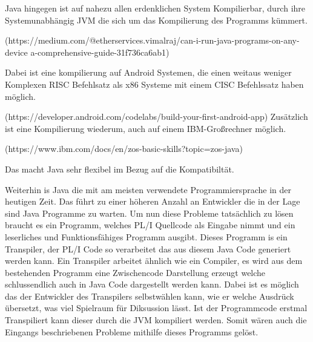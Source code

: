 Java hingegen ist auf nahezu allen erdenklichen System Kompilierbar, durch ihre Systemunabhängig JVM die sich um das Kompilierung des Programms kümmert. 

(https://medium.com/@etherservices.vimalraj/can-i-run-java-programs-on-any-device
a-comprehensive-guide-31f736ca6ab1) 

Dabei ist eine kompilierung auf Android Systemen, die einen weitaus weniger Komplexen RISC Befehlsatz als x86 Systeme mit einem CISC Befehlssatz haben möglich. 

(https://developer.android.com/codelabs/build-your-first-android-app) 
Zusätzlich ist eine Kompilierung wiederum, auch auf einem IBM-Großrechner möglich. 

(https://www.ibm.com/docs/en/zos-basic-skills?topic=zos-java)

Das macht Java sehr flexibel im Bezug auf die Kompatibiltät. 

Weiterhin is Java die mit am meisten verwendete Programmiersprache in der heutigen Zeit. Das führt zu einer höheren Anzahl an Entwickler die in der Lage sind Java Programme zu warten.
Um nun diese Probleme tatsächlich zu lösen braucht es ein Programm, welches PL/I Quellcode als Eingabe nimmt und ein leserliches und Funktionsfähiges Programm ausgibt. Dieses Programm is ein Transpiler, der PL/I Code so verarbeitet das aus diesem Java Code generiert werden kann. Ein Transpiler arbeitet ähnlich wie ein Compiler, es wird aus dem bestehenden Programm eine Zwischencode Darstellung erzeugt welche schlussendlich auch in Java Code dargestellt werden kann. Dabei ist es möglich das der Entwickler des Transpilers selbstwählen kann, wie er welche Ausdrück übersetzt, was viel Spielraum für Diksussion lässt. Ist der Programmcode erstmal Transpiliert kann dieser durch die JVM kompiliert werden. Somit wären auch die Eingangs beschriebenen Probleme mithilfe dieses Programms gelöst.
	 
     
     
     
     


